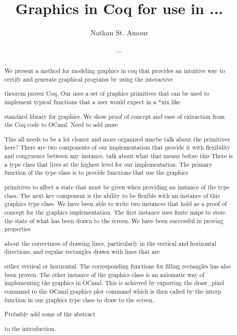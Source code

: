 \documentclass{llncs}
\begin{document}
\title{Graphics in Coq for use in ...}
\author{Nathan St. Amour \and ...}


\maketitle

\begin{abstract}

We present a method for modeling graphics in coq that provides an intuitive way to certify and generate graphical programs by using the interactive

theorem prover Coq.  Our uses a set of graphics primitives that can be used to implement typical functions that a user would expect in a *nix like

standard library for graphics.  We show proof of concept and ease of extraction from the Coq code to OCaml. {\color{red} Need to add more}

{\color{red} This all needs to be a lot clearer and more organized maybe talk about the primitives here?} There are two components of our implementation that provide it with flexibility and congruence between any instance. {\color{red}talk about what that means before this} There is a type class that lives at the highest level for our implementation.  The primary function of the type class is to provide functions that use the graphics

primitives to affect a state that must be given when providing an instance of the type class. The next key component is the ability to be flexible with an instance of this graphics type class.  We have been able to write two instances that hold as a proof of concept for the graphics implementation.  The first instance uses finite maps to store the state of what has been drawn to the screen.  We have been successful in proving properties

about the correctness of drawing lines, particularly in the vertical and horizontal directions, and regular rectangles drawn with lines that are

either vertical or horizontal.  The corresponding functions for filling rectangles has also been proven.  The other instance of the graphics class is an axiomatic way of implementing the graphics in OCaml.  This is achieved by exporting the draw\_pixel command to the OCaml graphics plot command which is then called by the interp function in our graphics type class to draw to the screen.  {\color{red}Probably add some of the abstract

  to the introduction.}
\end{abstract}
\end{document}

